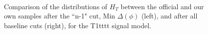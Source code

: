 \begin{figure}
        \centering
        \hspace{-1 cm}
        ~ %
        \caption{Comparison of the distributions of $H_T$ between the official and our own samples after the ``n-1" cut, Min $\Delta(\phi)$ (left), and after all baseline cuts (right), for the T1tttt signal model.}\label{fig:animals}
\end{figure}        
        
